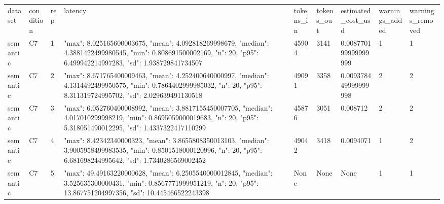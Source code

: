 \begin{tabular}{lllllllll}
dataset & condition & rep & latency & tokens\_in & tokens\_out & estimated\_cost\_usd & warnings\_added & warnings\_removed \\
semantic & C7 & 1 & {"max": 8.025165600003675, "mean": 4.092818269998679, "median": 4.3881422499980545, "min": 0.808691500002169, "n": 20, "p95": 6.499942214997283, "sd": 1.938729841734507} & 45904 & 3141 & 0.008770199999999999 & 1 & 1 \\
semantic & C7 & 2 & {"max": 8.671765400009463, "mean": 4.252400640000997, "median": 4.1314492499950575, "min": 0.7864402999985032, "n": 20, "p95": 8.311319724995702, "sd": 2.029639491130518} & 49091 & 3358 & 0.009378449999999998 & 2 & 2 \\
semantic & C7 & 3 & {"max": 6.052760400008992, "mean": 3.8817155450007705, "median": 4.017010299998219, "min": 0.8695059000019683, "n": 20, "p95": 5.318051490012295, "sd": 1.4337322417110299} & 45876 & 3051 & 0.008712 & 2 & 2 \\
semantic & C7 & 4 & {"max": 8.42342340000323, "mean": 3.8655808350013103, "median": 3.9005958499983535, "min": 0.8501518000120996, "n": 20, "p95": 6.681698244995642, "sd": 1.7340286569002452} & 49042 & 3418 & 0.0094071 & 1 & 2 \\
semantic & C7 & 5 & {"max": 49.49163220000628, "mean": 6.2505540000012845, "median": 3.525635300000431, "min": 0.8567771999951219, "n": 20, "p95": 13.867751204997356, "sd": 10.445466522243398} & None & None & None & 1 & 1 \\
\end{tabular}